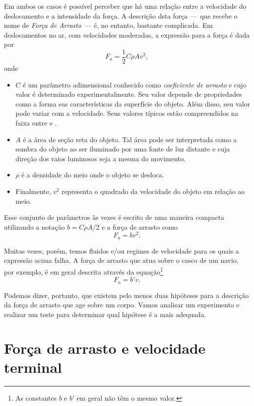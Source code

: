 Em ambos os casos é possível perceber que há uma relação entre a velocidade do deslocamento e a intensidade da força. A descrição dsta força ---~que recebe o nome de \emph{Força de Arrasto}~--- é, no entanto, bastante complicada. Em deslocamentos no ar, com velocidades moderadas, a expressão para a força é dada por
\begin{equation}
	F_a = \frac{1}{2} C\rho A v^2,
\end{equation}
%
onde
\begin{itemize}
	\item $C$ é um parâmetro adimensional conhecido como \emph{coeficiente de arrasto} e cujo valor é determinado experimentalmente. Seu valor depende de propriedades como a forma eas características da superfície do objeto. Além disso, seu valor pode variar com a velocidade. Seus valores típicos estão compreendidos na faixa entre  e .
	\item $A$ é a área de seção reta do objeto. Tal área pode ser interpretada como a sombra do objeto ao ser iluminado por uma fonte de luz distante e cuja direção dos raios luminosos seja a mesma do movimento.
	\item $\rho$ é a densidade do meio onde o objeto se desloca.
	\item Finalmente, $v^2$ representa o quadrado da velocidade do objeto em relação ao meio.
\end{itemize}

\pagebreak

Esse conjunto de parâmetros às vezes é escrito de uma maneira compacta utilizando a notação $b=C\rho A /2$ e a força de arrasto como
\begin{equation}
	F_a = bv^2.
\end{equation}

Muitas vezes, porém, temos fluidos e/ou regimes de velocidade para os quais a expressão acima falha. A força de arrasto que atua sobre o casco de um navio, por exemplo, é em geral descrita através da equação\footnote{As constantes $b$ e $b'$ em geral não têm o mesmo valor.}
\begin{equation}
	F_a = b'v.
\end{equation}

Podemos dizer, portanto, que existem pelo menos duas hipóteses para a descrição da força de arrasto que age sobre um corpo. Vamos analisar um experimento e realizar um teste para determinar qual hipótese é a mais adequada.

\section{Força de arrasto e velocidade terminal}
\label{SecaoF_a}

